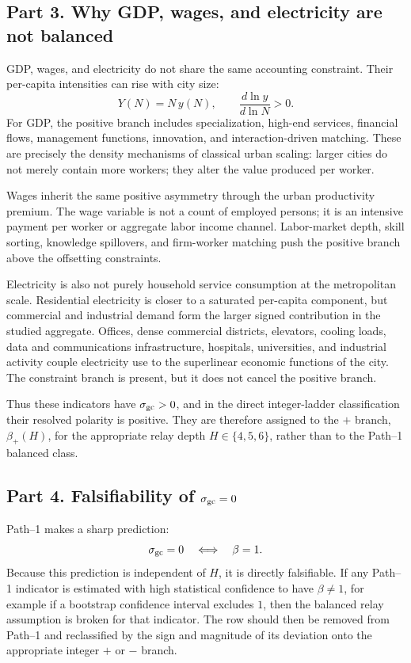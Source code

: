 \subsection*{Part 3. Why GDP, wages, and electricity are not balanced}

GDP, wages, and electricity do not share the same accounting constraint. Their per-capita intensities can rise with city size:
\[
Y(N)=N\,y(N),\qquad \frac{d\ln y}{d\ln N}>0 .
\]
For GDP, the positive branch includes specialization, high-end services, financial flows, management functions, innovation, and interaction-driven matching. These are precisely the density mechanisms of classical urban scaling: larger cities do not merely contain more workers; they alter the value produced per worker.

Wages inherit the same positive asymmetry through the urban productivity premium. The wage variable is not a count of employed persons; it is an intensive payment per worker or aggregate labor income channel. Labor-market depth, skill sorting, knowledge spillovers, and firm-worker matching push the positive branch above the offsetting constraints.

Electricity is also not purely household service consumption at the metropolitan scale. Residential electricity is closer to a saturated per-capita component, but commercial and industrial demand form the larger signed contribution in the studied aggregate. Offices, dense commercial districts, elevators, cooling loads, data and communications infrastructure, hospitals, universities, and industrial activity couple electricity use to the superlinear economic functions of the city. The constraint branch is present, but it does not cancel the positive branch.

Thus these indicators have \(\sigma_{\rm gc}>0\), and in the direct integer-ladder classification their resolved polarity is positive. They are therefore assigned to the \(+\) branch, \(\beta_+(H)\), for the appropriate relay depth \(H\in\{4,5,6\}\), rather than to the Path--1 balanced class.

\subsection*{Part 4. Falsifiability of \(\sigma_{\rm gc}=0\)}

Path--1 makes a sharp prediction:
\[
\sigma_{\rm gc}=0\quad\Longleftrightarrow\quad \beta=1 .
\]
Because this prediction is independent of \(H\), it is directly falsifiable. If any Path--1 indicator is estimated with high statistical confidence to have \(\beta\neq 1\), for example if a bootstrap confidence interval excludes \(1\), then the balanced relay assumption is broken for that indicator. The row should then be removed from Path--1 and reclassified by the sign and magnitude of its deviation onto the appropriate integer \(+\) or \(-\) branch.


